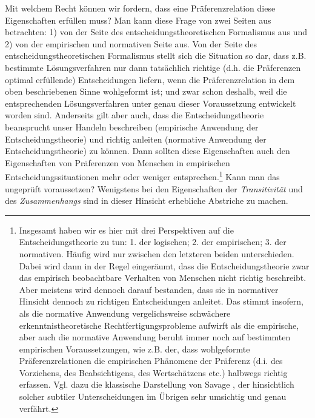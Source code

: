 Mit welchem Recht können wir fordern, dass eine Präferenzrelation diese
Eigenschaften erfüllen muss? Man kann diese Frage von zwei Seiten aus betrachten:
1) von der Seite des entscheidungstheoretischen Formalismus aus und 2) von der
empirischen und normativen Seite aus. Von der Seite des
entscheidungstheoretischen Formalismus stellt sich die Situation so dar, dass
z.B. bestimmte Lösungsverfahren nur dann tatsächlich richtige (d.h. die
Präferenzen optimal erfüllende) Entscheidungen liefern, wenn die
Präferenzrelation in dem oben beschriebenen Sinne wohlgeformt ist; und zwar schon
deshalb, weil die entsprechenden Lösungsverfahren unter genau dieser
Voraussetzung entwickelt worden sind. Anderseits gilt aber auch, dass die
Entscheidungstheorie beansprucht unser Handeln beschreiben (empirische Anwendung
der Entscheidungstheorie) und richtig anleiten (normative Anwendung der
Entscheidungstheorie) zu können. Dann sollten diese Eigenschaften auch den
Eigenschaften von Präferenzen von Menschen in empirischen
Entscheidungssituationen mehr oder weniger entsprechen.\footnote{Insgesamt haben
wir es hier mit drei Perspektiven auf die Entscheidungstheorie zu tun: 1. der
logischen; 2. der empirischen; 3. der normativen. Häufig wird nur zwischen den
letzteren beiden unterschieden. Dabei wird dann in der Regel eingeräumt, dass die
Entscheidungstheorie zwar das empirisch beobachtbare Verhalten von Menschen nicht
richtig beschreibt. Aber meistens wird dennoch darauf bestanden, dass sie in
normativer Hinsicht dennoch zu richtigen Entscheidungen anleitet. Das stimmt
insofern, als die normative Anwendung vergelichsweise schwächere
erkenntnistheoretische Rechtfertigungsprobleme aufwirft als die empirische, aber
auch die normative Anwendung beruht immer noch auf bestimmten empirischen
Voraussetzungen, wie z.B. der, dass wohlgeformte Präferenzrelationen die
empirischen Phänomene der Präferenz (d.i. des Vorziehens, des Beabsichtigens, des
Wertschätzens etc.) halbwegs richtig erfassen. Vgl. dazu die klassische
Darstellung von Savage \cite[S. 7ff.]{savage:1954}, der hinsichtlich solcher
subtiler Unterscheidungen im Übrigen sehr umsichtig und genau verfährt.} Kann
man das ungeprüft voraussetzen? Wenigstens bei den Eigenschaften der {\em
Transitivität} und des {\em Zusammenhangs} sind in dieser Hinsicht erhebliche
Abstriche zu machen.

